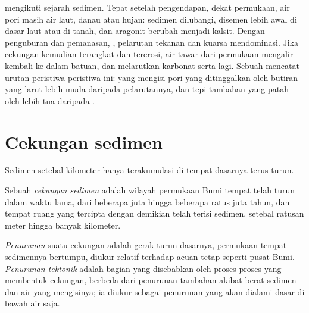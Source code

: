  mengikuti sejarah sedimen. Tepat setelah pengendapan, dekat permukaan, air pori masih air laut, danau atau hujan: sedimen dilubangi, disemen lebih awal di dasar laut atau di tanah, dan aragonit berubah menjadi kalsit. Dengan penguburan dan pemanasan, , pelarutan tekanan dan  kuarsa mendominasi. Jika cekungan kemudian terangkat dan tererosi, air tawar dari permukaan mengalir kembali ke dalam batuan, dan melarutkan karbonat serta  lagi. Sebuah  mencatat urutan peristiwa-peristiwa ini:  yang mengisi pori yang ditinggalkan oleh butiran yang larut lebih muda daripada pelarutannya, dan tepi tambahan yang patah oleh  lebih tua daripada .

\section{Cekungan sedimen}\label{sec:b1:diagenesis-basins:basins}

Sedimen setebal kilometer hanya terakumulasi di tempat dasarnya terus turun.

\begin{definition}\label{def:b1:diagenesis-basins:basin}
Sebuah \emph{cekungan sedimen} adalah wilayah permukaan Bumi tempat  telah turun dalam waktu lama, dari beberapa juta hingga beberapa ratus juta tahun, dan tempat ruang yang tercipta dengan demikian telah terisi sedimen, setebal ratusan meter hingga banyak kilometer.
\end{definition}

\begin{definition}\label{def:b1:diagenesis-basins:subsidence}
\emph{Penurunan} suatu cekungan adalah gerak turun dasarnya, permukaan tempat sedimennya bertumpu, diukur relatif terhadap acuan tetap seperti pusat Bumi. \emph{Penurunan tektonik} adalah bagian yang disebabkan oleh proses-proses yang membentuk cekungan, berbeda dari penurunan tambahan akibat berat sedimen dan air yang mengisinya; ia diukur sebagai penurunan yang akan dialami dasar di bawah air saja.
\end{definition}

